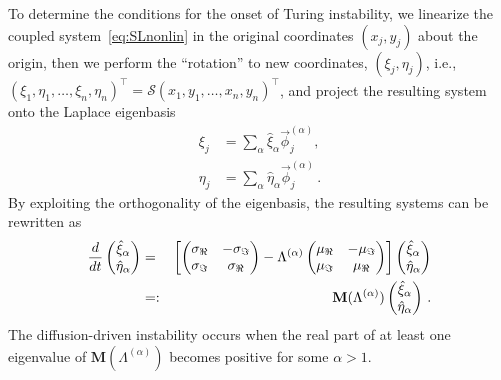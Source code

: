 \documentclass[aps,showpacs,preprintnumbers,amsmath,amssymb,twocolumn,superscriptaddress,floatfix,nofootinbib,10pt,pre]{revtex4-1}
\begin{document}
To determine the conditions for the onset of Turing instability, we linearize the coupled system~\eqref{eq:SLnonlin} in the original coordinates $(x_j,y_j)$ about the origin, then we perform the ``rotation'' to new coordinates, $(\xi_j,\eta_j)$, i.e., $(\xi_1,\eta_1,\dots,\xi_n,\eta_n)^\top=\mathcal{S}(x_1,y_1,\dots,x_n,y_n)^\top$, and project the resulting system onto the Laplace eigenbasis
\begin{align}
    \xi_j&=\sum_\alpha\hat{\xi}_\alpha\vec{\phi}^{(\alpha)}_j, \\\eta_j&=\sum_\alpha\hat{\eta}_\alpha\vec{\phi}^{(\alpha)}_j\, .
\end{align}
By exploiting the orthogonality of the eigenbasis, the resulting systems can be rewritten as 
\begin{eqnarray}
    \frac{d}{dt}\begin{pmatrix}
        \hat{\xi}_\alpha \\ \hat{\eta}_\alpha
\end{pmatrix} &=& \left[\begin{pmatrix}
 \sigma_{\Re} & -\sigma_{\Im}\\
 \sigma_{\Im} & \sigma_{\Re}
\end{pmatrix}-\Lambda^{(\alpha)}\begin{pmatrix}
 \mu_{\Re} & -\mu_{\Im}\\
 \mu_{\Im} & \mu_{\Re}
\end{pmatrix}\right]\begin{pmatrix}
        \hat{\xi}_\alpha \\ \hat{\eta}_\alpha
\end{pmatrix}\notag\\
&=:&\mathbf{M}(\Lambda^{(\alpha)})\begin{pmatrix}
        \hat{\xi}_\alpha \\ \hat{\eta}_\alpha
\end{pmatrix}\, .
\end{eqnarray}
The diffusion-driven instability occurs when the real part of at least one eigenvalue of $\mathbf{M}(\Lambda^{(\alpha)})$ becomes positive for some $\alpha>1$. 
\end{document}
